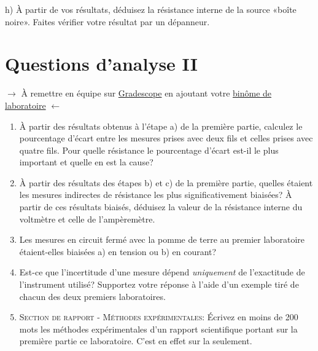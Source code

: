 \documentclass[canadien,12pt,oneside,letterpaper]{article}
\begin{document}
h) À partir de vos résultats, déduisez la résistance interne de la source «boîte noire». Faites vérifier votre résultat par un dépanneur.


\section{Questions d'analyse II} \label{sec:grade}
\vspace{-0.5cm}
\noindent$\rightarrow$ À remettre en équipe sur \href{https://www.gradescope.com/}{Gradescope} en ajoutant votre \href{https://help.gradescope.com/article/m5qz2xsnjy-student-add-group-members}{binôme de laboratoire} $\leftarrow$

\begin{enumerate}
\item À partir des résultats obtenus à l'étape a) de la première partie, calculez le pourcentage d'écart entre les mesures prises avec deux fils et celles prises avec quatre fils. Pour quelle résistance le pourcentage d'écart est-il le plus important et quelle en est la cause?
\item À partir des résultats des étapes b) et c) de la première partie, quelles étaient les mesures indirectes de résistance les plus significativement biaisées? À partir de ces résultats biaisés, déduisez la valeur de la résistance interne du voltmètre et celle de l'ampèremètre.
\item Les mesures en circuit fermé avec la pomme de terre au premier laboratoire étaient-elles biaisées a) en tension ou b) en courant?
\item Est-ce que l'incertitude d'une mesure dépend \textit{uniquement} de l'exactitude de l'instrument utilisé? Supportez votre réponse à l'aide d'un exemple tiré de chacun des deux premiers laboratoires.
\item \textsc{Section de rapport - Méthodes expérimentales:} Écrivez en moins de 200 mots les méthodes expérimentales d'un rapport scientifique portant sur la première partie ce laboratoire. C'est en effet sur la  seulement.
\end{enumerate}
\end{document}
